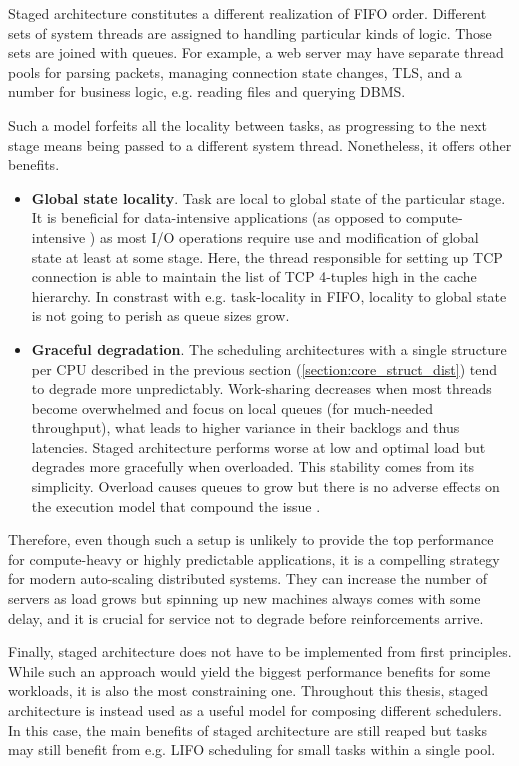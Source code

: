 \documentclass[12pt,a4paper,twoside]{report}
\begin{document}
Staged architecture \cite{Welsh2001} constitutes a different realization of FIFO order. Different sets of system threads are assigned to handling particular kinds of logic. Those sets are joined with queues. For example, a web server may have separate thread pools for parsing packets, managing connection state changes, TLS, and a number for business logic, e.g. reading files and querying DBMS.  

Such a model forfeits all the locality between tasks, as progressing to the next stage means being passed to a different system thread. Nonetheless, it offers other benefits. 
\begin{itemize}
    \item \textbf{Global state locality}. Task are local to global state of the particular stage. It is beneficial for data-intensive applications (as opposed to compute-intensive \cite{Kleppmann2017-en}) as most I/O operations require use and modification of global state at least at some stage. Here, the thread responsible for setting up TCP connection is able to maintain the list of TCP 4-tuples high in the cache hierarchy. In constrast with e.g. task-locality in FIFO, locality to global state is not going to perish as queue sizes grow.
    \item \textbf{Graceful degradation}. The scheduling architectures with a single  structure per CPU described in the previous section (\ref{section:core_struct_dist}) tend to degrade more unpredictably. Work-sharing decreases when most threads become overwhelmed and focus on local queues (for much-needed throughput), what leads to higher variance in their backlogs and thus latencies. Staged architecture performs worse at low and optimal load but degrades more gracefully when overloaded. This stability comes from its simplicity. Overload causes queues to grow but there is no adverse effects on the execution model that compound the issue \cite{Welsh2001}.
\end{itemize}

Therefore, even though such a setup is unlikely to provide the top performance for compute-heavy or highly predictable applications, it is a compelling strategy for modern auto-scaling distributed systems. They can increase the number of servers as load grows but spinning up new machines always comes with some delay, and it is crucial for service not to degrade before reinforcements arrive.

\label{section:staged-as-composition}
Finally, staged architecture does not have to be implemented from first principles. While such an approach would yield the biggest performance benefits for some workloads, it is also the most constraining one. Throughout this thesis, staged architecture is instead used as a useful model for composing different schedulers. In this case, the main benefits of staged architecture are still reaped but tasks may still benefit from e.g. LIFO scheduling for small tasks within a single pool. 
\end{document}
